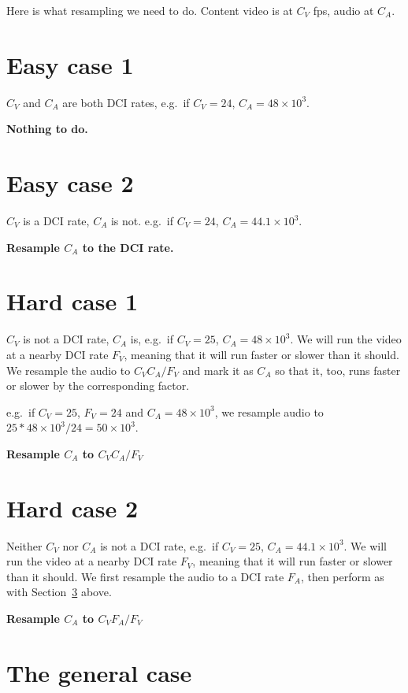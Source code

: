 \documentclass{article}
\begin{document}
Here is what resampling we need to do.  Content video is at $C_V$ fps, audio at $C_A$.

\section{Easy case 1}

$C_V$ and $C_A$ are both DCI rates, e.g.\ if $C_V = 24$, $C_A = 48\times{}10^3$.

\medskip
\textbf{Nothing to do.}

\section{Easy case 2}

$C_V$ is a DCI rate, $C_A$ is not.  e.g.\ if $C_V = 24$, $C_A = 44.1\times{}10^3$.

\medskip
\textbf{Resample $C_A$ to the DCI rate.}

\section{Hard case 1}
\label{sec:hard1}

$C_V$ is not a DCI rate, $C_A$ is, e.g.\ if $C_V = 25$, $C_A =
48\times{}10^3$.  We will run the video at a nearby DCI rate $F_V$,
meaning that it will run faster or slower than it should.  We resample
the audio to $C_V C_A / F_V$ and mark it as $C_A$ so that it, too,
runs faster or slower by the corresponding factor.

e.g.\ if $C_V = 25$, $F_V = 24$ and $C_A = 48\times{}10^3$, we
resample audio to $25 * 48\times{}10^3 / 24 = 50\times{}10^3$.

\medskip
\textbf{Resample $C_A$ to $C_V C_A / F_V$}

\section{Hard case 2}

Neither $C_V$ nor $C_A$ is not a DCI rate, e.g.\ if $C_V = 25$, $C_A =
44.1\times{}10^3$.  We will run the video at a nearby DCI rate $F_V$,
meaning that it will run faster or slower than it should.  We first
resample the audio to a DCI rate $F_A$, then perform as with
Section~\ref{sec:hard1} above.

\medskip
\textbf{Resample $C_A$ to $C_V F_A / F_V$}


\section{The general case}
\end{document}
